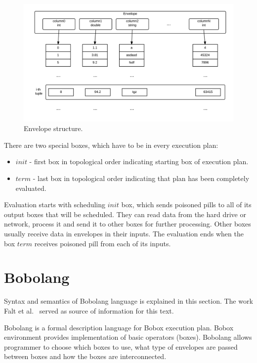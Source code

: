 \begin{figure}[h!]
  \centering
    \includegraphics[width=1\textwidth]{envelope}

      \caption{Envelope structure.}
          \label{fig:envelope}
\end{figure}
There are two special boxes, which have to be in every execution plan:
\begin{itemize}


\item $init$ - first box in topological order indicating starting box of execution plan.

\item $term$ - last box in topological order indicating that plan has been completely evaluated.

\end{itemize}

Evaluation starts with scheduling $init$ box, which sends poisoned pills to all of its output boxes that will be scheduled. They can read data from the hard drive or network, process it and send it to other boxes for further processing. Other boxes usually receive data in envelopes in their inputs. 
The evaluation ends when the box $term$ receives poisoned pill from each of its inputs.

\section{Bobolang}
Syntax and semantics of Bobolang language is explained in this section. The work Falt et al.~\cite{bobolang} served as source of information for this text.

Bobolang is a formal description language for Bobox execution plan. Bobox environment provides implementation of basic operators (boxes). Bobolang allows programmer to choose which boxes to use, what type of envelopes are passed between boxes and how the boxes are interconnected. 

